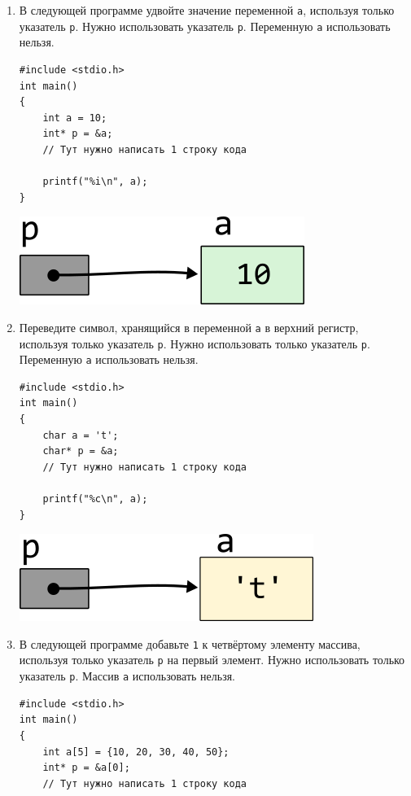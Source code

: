 \documentclass[10pt]{article}
\begin{document}
\begin{enumerate}
\newpage
\item В следующей программе удвойте значение переменной \texttt{a}, используя только указатель \texttt{p}. Нужно использовать указатель \texttt{p}. Переменную \texttt{a} использовать нельзя.
\begin{multicols}{2}\noindent
\begin{lstlisting}
#include <stdio.h>
int main() 
{
    int a = 10;
    int* p = &a;
    // Тут нужно написать 1 строку кода
    
    printf("%i\n", a);
}
\end{lstlisting}
\vfill \null    
\columnbreak
\vfill \null 
\begin{center}
\includegraphics[scale=1]{../images/pointer_schemes/pointer_to_int.png}
\end{center}
\end{multicols}


\item Переведите символ, хранящийся в переменной \texttt{a} в верхний регистр, используя только указатель \texttt{p}. Нужно использовать только указатель \texttt{p}. Переменную \texttt{a} использовать нельзя.
\begin{multicols}{2}\noindent
\begin{lstlisting}
#include <stdio.h>
int main() 
{
    char a = 't';
    char* p = &a;
    // Тут нужно написать 1 строку кода
    
    printf("%c\n", a);
}
\end{lstlisting}
\vfill \null    
\columnbreak
\vfill \null 
\begin{center}
\includegraphics[scale=1]{../images/pointer_schemes/pointer_to_char.png}
\end{center}
\end{multicols}


\item В следующей программе добавьте \texttt{1} к четвёртому элементу массива, используя только указатель \texttt{p} на первый элемент. Нужно использовать только указатель \texttt{p}. Массив \texttt{a} использовать нельзя.
\begin{multicols}{2}\noindent
\begin{lstlisting}
#include <stdio.h>
int main() 
{
    int a[5] = {10, 20, 30, 40, 50};
    int* p = &a[0];
    // Тут нужно написать 1 строку кода
    

\end{lstlisting}
\end{multicols}
\end{enumerate}
\end{document}
